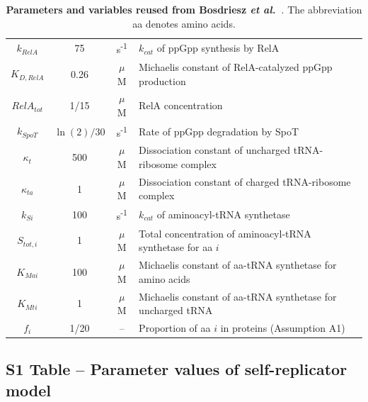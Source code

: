 \begin{table}[p]
\begin{tabular}{cccl}
$k_{RelA}$ & 75 & s\textsuperscript{-1} & $k_{cat}$ of ppGpp synthesis by RelA\\

$K_{D,RelA}$ & 0.26 & $\mu$M & Michaelis constant of RelA-catalyzed ppGpp production\\

$RelA_{tot}$ & 1/15 & $\mu$M & RelA concentration\\

$k_{SpoT}$ & $\ln (2) / 30$ & s\textsuperscript{-1} & Rate of ppGpp degradation by SpoT\\

$\kappa_t$ & 500 & $\mu$M & Dissociation constant of uncharged tRNA-ribosome complex\\

$\kappa_{ta}$ & 1 & $\mu$M & Dissociation constant of charged tRNA-ribosome complex\\

$k_{Si}$ & 100 & s\textsuperscript{-1} & $k_{cat}$ of aminoacyl-tRNA synthetase\\

$S_{tot,i}$ & 1 & $\mu$M & Total concentration of aminoacyl-tRNA synthetase for aa $i$\\

$K_{Mai}$ & 100 & $\mu$M & Michaelis constant of aa-tRNA synthetase for amino acids\\

$K_{Mti}$ & 1 & $\mu$M & Michaelis constant of aa-tRNA synthetase for uncharged tRNA\\

$f_i$ & 1/20 & -- & Proportion of aa $i$ in proteins (Assumption A1)\\

\end{tabular}
\caption{\textbf{Parameters and variables reused from Bosdriesz \textit{et al.}~\cite{bosdriesz_how_2015}}. The abbreviation aa denotes amino acids.}
\label{tab:notations}
\end{table}

\clearpage

\subsection{S1 Table -- Parameter values of self-replicator model}

